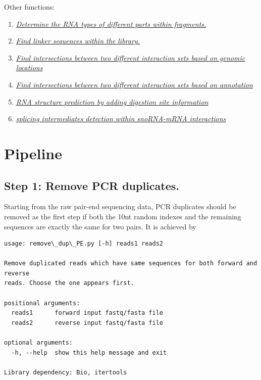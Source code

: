 \documentclass[letterpaper,10pt,english]{sphinxmanual}
\begin{document}
Other functions:
\begin{enumerate}
\item {} 
{\hyperref[Analysis_pipeline:rna-types]{\emph{Determine the RNA types of different parts within fragments.}}}

\item {} 
{\hyperref[Analysis_pipeline:find-linker]{\emph{Find linker sequences within the library.}}}

\item {} 
{\hyperref[Analysis_pipeline:intersection]{\emph{Find intersections between two different interaction sets based on genomic locations}}}

\item {} 
{\hyperref[Analysis_pipeline:intersectiongene]{\emph{Find intersections between two different interaction sets based on annotation}}}

\item {} 
{\hyperref[Analysis_pipeline:structure]{\emph{RNA structure prediction by adding digestion site information}}}

\item {} 
{\hyperref[Analysis_pipeline:snorna-mrna]{\emph{splicing intermediates detection within snoRNA-mRNA interactions}}}

\end{enumerate}


\section{Pipeline}
\label{Analysis_pipeline:pipeline}

\subsection{Step 1: Remove PCR duplicates.}
\label{Analysis_pipeline:step-1-remove-pcr-duplicates}\label{Analysis_pipeline:step1}
Starting from the raw pair-end sequencing data, PCR duplicates should be removed as the first step if both the 10nt random indexes and the remaining sequences are exactly the same for two pairs. It is achieved by 

\begin{Verbatim}[commandchars=\\\{\}]
usage: remove\_dup\_PE.py [-h] reads1 reads2

Remove duplicated reads which have same sequences for both forward and reverse
reads. Choose the one appears first.

positional arguments:
  reads1      forward input fastq/fasta file
  reads2      reverse input fastq/fasta file

optional arguments:
  -h, --help  show this help message and exit

Library dependency: Bio, itertools
\end{Verbatim}
\end{document}
